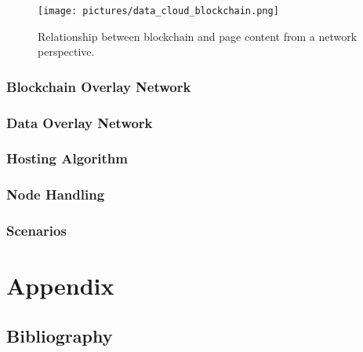 \documentclass[12pt,fleqn]{book} %
\begin{document}
\begin{figure}[htp]
\centering
\texttt{[image: pictures/data\_cloud\_blockchain.png]}
\caption{Relationship between blockchain and page content from a network
perspective.}
\label{fig:data_cloud_blockchain}
\end{figure}

\section{Blockchain Overlay Network}

\section{Data Overlay Network}
\section{Hosting Algorithm}
\section{Node Handling}

\section{Scenarios}


\part{Appendix}

\chapter*{Bibliography}
\printbibliography[heading=bibempty]
\end{document}
